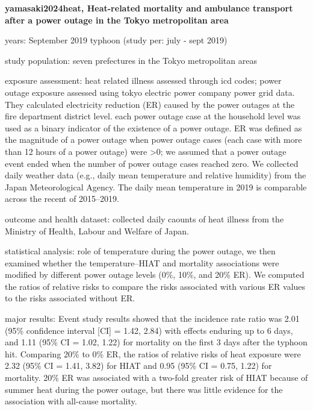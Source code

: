 \textbf{yamasaki2024heat, Heat-related mortality and ambulance transport after a power outage in the Tokyo metropolitan area}
    \item years: September 2019 typhoon (study per: july - sept 2019)
    \item study population: seven prefectures in the Tokyo metropolitan areas
    \item exposure assessment: heat related illness assessed through icd codes; power outage exposure assessed using tokyo electric power company power grid data. They calculated electricity reduction (ER) caused by the power outages at the fire department district level. each power outage case at the household level was used as a binary indicator of the existence of a power outage. ER was defined as the magnitude of a power outage when power outage cases (each case with more than 12 hours of a power outage) were >0; we assumed that a power outage event ended when the number of power outage cases reached zero. We collected daily weather data (e.g., daily mean temperature and relative humidity) from the Japan Meteorological Agency. The daily mean temperature in 2019 is comparable across the recent of 2015–2019.
    \item outcome and health dataset: collected daily caounts of heat illness from the Ministry of Health, Labour and Welfare of Japan. 
    \item statistical analysis: role of temperature during the power outage, we then examined whether the temperature–HIAT and mortality associations were modified by different power outage levels (0\%, 10\%, and 20\% ER). We computed the ratios of relative risks to compare the risks associated with various ER values to the risks associated without ER.
    \item major results: Event study results showed that the incidence rate ratio was 2.01 (95\% confidence interval [CI] = 1.42, 2.84) with effects enduring up to 6 days, and 1.11 (95\% CI = 1.02, 1.22) for mortality on the first 3 days after the typhoon hit. Comparing 20\% to 0\% ER, the ratios of relative risks of heat exposure were 2.32 (95\% CI = 1.41, 3.82) for HIAT and 0.95 (95\% CI = 0.75, 1.22) for mortality. 20\% ER was associated with a two-fold greater risk of HIAT because of summer heat during the power outage, but there was little evidence for the association with all-cause mortality.

